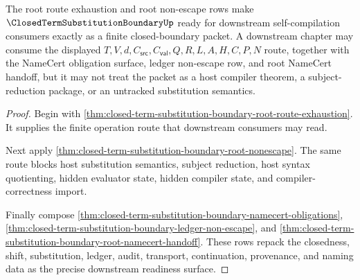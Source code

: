 \begin{theorem}
\label{thm:closed-term-substitution-boundary-root-downstream-readiness}
The root route exhaustion and root non-escape rows make $\ClosedTermSubstitutionBoundaryUp$ ready for downstream self-compilation consumers exactly as a finite closed-boundary packet. A downstream chapter may consume the displayed $T,V,d,C_{\mathsf{src}},C_{\mathsf{val}},Q,R,L,A,H,C,P,N$ route, together with the NameCert obligation surface, ledger non-escape row, and root NameCert handoff, but it may not treat the packet as a host compiler theorem, a subject-reduction package, or an untracked substitution semantics.
\end{theorem}
\begin{proof}
Begin with \autoref{thm:closed-term-substitution-boundary-root-route-exhaustion}. It supplies the finite operation route that downstream consumers may read.

Next apply \autoref{thm:closed-term-substitution-boundary-root-nonescape}. The same route blocks host substitution semantics, subject reduction, host syntax quotienting, hidden evaluator state, hidden compiler state, and compiler-correctness import.

Finally compose \autoref{thm:closed-term-substitution-boundary-namecert-obligations}, \autoref{thm:closed-term-substitution-boundary-ledger-non-escape}, and \autoref{thm:closed-term-substitution-boundary-root-namecert-handoff}. These rows repack the closedness, shift, substitution, ledger, audit, transport, continuation, provenance, and naming data as the precise downstream readiness surface.
\end{proof}

